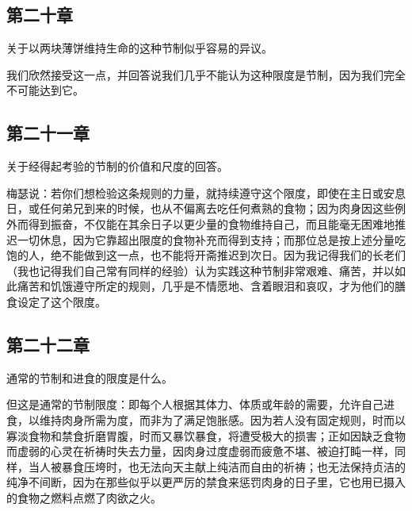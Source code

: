 \subsection{第二十章}

关于以两块薄饼维持生命的这种节制似乎容易的异议。\par

我们欣然接受这一点，并回答说我们几乎不能认为这种限度是节制，因为我们完全不可能达到它。\par


\subsection{第二十一章}

关于经得起考验的节制的价值和尺度的回答。\par

梅瑟说：若你们想检验这条规则的力量，就持续遵守这个限度，即使在主日或安息日，或任何弟兄到来的时候，也从不偏离去吃任何煮熟的食物；因为肉身因这些例外而得到振奋，不仅能在其余日子以更少量的食物维持自己，而且能毫无困难地推迟一切休息，因为它靠超出限度的食物补充而得到支持；而那位总是按上述分量吃饱的人，绝不能做到这一点，也不能将开斋推迟到次日。因为我记得我们的长老们（我也记得我们自己常有同样的经验）认为实践这种节制非常艰难、痛苦，并以如此痛苦和饥饿遵守所定的规则，几乎是不情愿地、含着眼泪和哀叹，才为他们的膳食设定了这个限度。\par


\subsection{第二十二章}

通常的节制和进食的限度是什么。\par

但这是通常的节制限度：即每个人根据其体力、体质或年龄的需要，允许自己进食，以维持肉身所需为度，而非为了满足饱胀感。因为若人没有固定规则，时而以寡淡食物和禁食折磨胃腹，时而又暴饮暴食，将遭受极大的损害；正如因缺乏食物而虚弱的心灵在祈祷时失去力量，因肉身过度虚弱而疲惫不堪、被迫打盹一样，同样，当人被暴食压垮时，也无法向天主献上纯洁而自由的祈祷；也无法保持贞洁的纯净不间断，因为在那些似乎以更严厉的禁食来惩罚肉身的日子里，它也用已摄入的食物之燃料点燃了肉欲之火。\par

